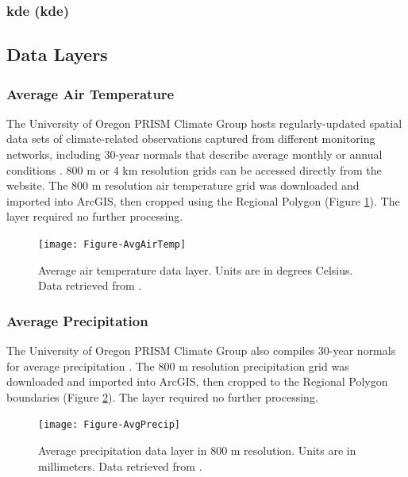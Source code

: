 \subsubsection{\acrlong{kde} (\acrshort{kde})}\label{ssn:kde}

\subsection{Data Layers}

\subsubsection{Average Air Temperature}

The University of Oregon PRISM Climate Group hosts regularly-updated spatial data sets of climate-related observations captured from different monitoring networks, including 30-year normals that describe average monthly or annual conditions \citep{daly_physiographically_2008, prism_prism_2021}. 800 m or 4 km resolution grids can be accessed directly from the website. The 800 m resolution air temperature grid was downloaded and imported into ArcGIS, then cropped using the Regional Polygon (Figure \ref{fig:feat_airtemp}). The layer required no further processing.

\begin{figure}[!htp]
\centering
\texttt{[image: Figure-AvgAirTemp]}
\caption[Average air temperature data layer]{Average air temperature data layer. Units are in degrees Celsius. Data retrieved from \protect\citep{prism_prism_2021}.}
\label{fig:feat_airtemp}
\end{figure}

\subsubsection{Average Precipitation}

The University of Oregon PRISM Climate Group also compiles 30-year normals for average precipitation \citep{daly_physiographically_2008, prism_prism_2021}. The 800 m resolution precipitation grid was downloaded and imported into ArcGIS, then cropped to the Regional Polygon boundaries (Figure \ref{fig:feat_precip}). The layer required no further processing.

\begin{figure}[!htp]
\centering
\texttt{[image: Figure-AvgPrecip]}
\caption[Average precipitation data layer]{Average precipitation data layer in 800 m resolution. Units are in millimeters. Data retrieved from \protect\citep{prism_prism_2021}.}
\label{fig:feat_precip}
\end{figure}

